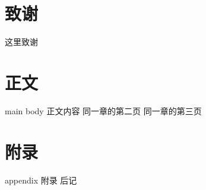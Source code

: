 \documentclass[degree=undergraduate,bibstyle=numerical,font=fandol]{xmuthesis}
\begin{document}
\maketitle
\chapter*{致谢}
这里致谢
\begin{abstract}*
    中文摘要
\end{abstract}
\begin{abstract}
    English abstract. 
\end{abstract}
\xmutableofcontents %
\chapter{正文}{main body}
正文内容
\newpage
同一章的第二页
\newpage
同一章的第三页
\nocite{*} 

\appendix
\chapter{附录}{appendix}
附录
\backmatter
后记
\end{document}
